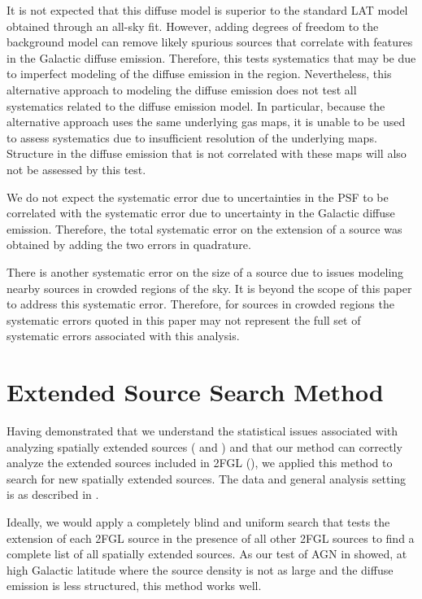It is not expected that this diffuse model is superior to the standard
LAT model obtained through an all-sky fit.  However, adding degrees of
freedom to the background model can remove likely spurious sources that
correlate with features in the Galactic diffuse emission.  Therefore,
this tests systematics that may be due to imperfect modeling of the
diffuse emission in the region. 
Nevertheless, this alternative approach to modeling the diffuse emission
does not test all systematics related to the diffuse emission model. In
particular, because the alternative approach uses the same underlying gas
maps, it is unable to be used to assess systematics due to insufficient
resolution of the underlying maps. Structure in the diffuse emission that
is not correlated with these maps will also not be assessed by this test.

We do not expect the systematic error due to uncertainties in the PSF
to be correlated with the systematic error due to uncertainty in the
Galactic diffuse emission. Therefore, the total systematic error on the
extension of a source was obtained by adding the two errors in quadrature.

There is another systematic error on the size of a source due to issues
modeling nearby sources in crowded regions of the sky. It is beyond the
scope of this paper to address this systematic error. Therefore, 
for sources in crowded regions the systematic
errors quoted in this paper 
may not represent the full set of systematic errors associated with this analysis.

\section{Extended Source Search Method}


Having demonstrated that we understand the statistical
issues associated with analyzing spatially extended sources
( and ) and
that our method can correctly analyze the extended sources included in
2FGL (), we applied this method to search for
new spatially extended \gev sources.
The data and general analysis setting is as described in .

Ideally, we would apply a completely blind and uniform search that
tests the extension of each 2FGL source in the presence of all other
2FGL sources to find a complete list of all spatially extended sources.
As our test of AGN in  showed, at high
Galactic latitude where the source density is not as large and the
diffuse emission is less structured, this method works well.

